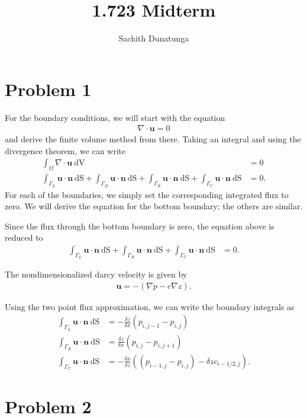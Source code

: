 \documentclass{article}
\title{1.723 Midterm}
\author{Sachith  Dunatunga}
\begin{document}
\maketitle

\section{Problem 1}
For the boundary conditions, we will start with the equation
\begin{align}
 \nabla \cdot \mathbf{u} = 0
\end{align}
and derive the finite volume method from there.
Taking an integral and using the divergence theorem, we can write
\begin{align}
\int_\Omega \nabla \cdot \mathbf{u}\ \mathrm{dV} &= 0 \\
\int_{\Gamma_{L}} \mathbf{u} \cdot \mathbf{n}\ \mathrm{dS} +
\int_{\Gamma_{D}} \mathbf{u} \cdot \mathbf{n}\ \mathrm{dS} +
\int_{\Gamma_{R}} \mathbf{u} \cdot \mathbf{n}\ \mathrm{dS} +
\int_{\Gamma_{U}} \mathbf{u} \cdot \mathbf{n}\ \mathrm{dS} &= 0.
\end{align}
For each of the boundaries, we simply set the corresponding integrated flux to zero.
We will derive the equation for the bottom boundary; the others are similar.

Since the flux through the bottom boundary is zero, the equation above is reduced to
\begin{align}
\int_{\Gamma_{L}} \mathbf{u} \cdot \mathbf{n}\ \mathrm{dS} +
\int_{\Gamma_{R}} \mathbf{u} \cdot \mathbf{n}\ \mathrm{dS} +
\int_{\Gamma_{U}} \mathbf{u} \cdot \mathbf{n}\ \mathrm{dS} &= 0.
\end{align}

The nondimensionalized darcy velocity is given by
\begin{align}
\mathbf{u} = - (\nabla p - c \nabla z).
\end{align}

Using the two point flux approximation, we can write the boundary integrals as
\begin{align}
\int_{\Gamma_{L}} \mathbf{u} \cdot \mathbf{n}\ \mathrm{dS} &= - \frac{\delta z}{\delta x} (p_{i,j-1} - p_{i,j}) \\
\int_{\Gamma_{R}} \mathbf{u} \cdot \mathbf{n}\ \mathrm{dS} &= \frac{\delta z}{\delta x} (p_{i,j} - p_{i,j+1}) \\
\int_{\Gamma_{U}} \mathbf{u} \cdot \mathbf{n}\ \mathrm{dS} &= - \frac{\delta x}{\delta z} \left( (p_{i-1,j} - p_{i,j}) - \delta z c_{i-1/2,j} \right).
\end{align}

\section{Problem 2}

% 
\end{document}
